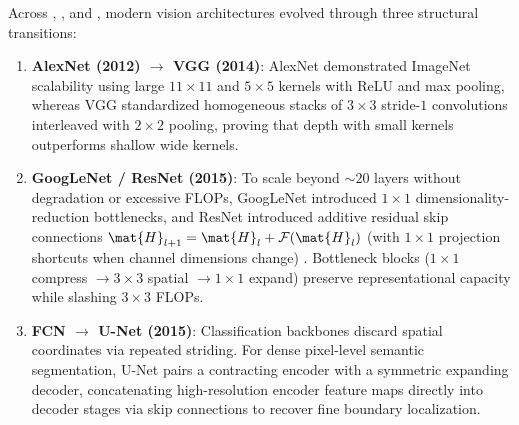 \documentclass[../../../../master.tex]{subfiles}
\begin{document}
\begin{crossbook}
\label{box:cnn:backbones}
Across , , and , modern vision architectures evolved through three structural transitions:
\begin{enumerate}
  \item \textbf{AlexNet (2012) $\to$ VGG (2014)}: AlexNet demonstrated ImageNet scalability using large $11 \times 11$ and $5 \times 5$ kernels with ReLU and max pooling, whereas VGG standardized homogeneous stacks of $3 \times 3$ stride-$1$ convolutions interleaved with $2 \times 2$ pooling, proving that depth with small kernels outperforms shallow wide kernels.
  \item \textbf{GoogLeNet / ResNet (2015)}: To scale beyond $\sim 20$ layers without degradation or excessive FLOPs, GoogLeNet introduced $1 \times 1$ dimensionality-reduction bottlenecks, and ResNet introduced additive residual skip connections $\mat{H}_{l+1} = \mat{H}_l + \mathcal{F}(\mat{H}_l)$ (with $1 \times 1$ projection shortcuts when channel dimensions change) . Bottleneck blocks ($1\times 1$ compress $\to 3\times 3$ spatial $\to 1\times 1$ expand) preserve representational capacity while slashing $3\times 3$ FLOPs.
  \item \textbf{FCN $\to$ U-Net (2015)}: Classification backbones discard spatial coordinates via repeated striding. For dense pixel-level semantic segmentation, U-Net  pairs a contracting encoder with a symmetric expanding decoder, concatenating high-resolution encoder feature maps directly into decoder stages via skip connections to recover fine boundary localization.
\end{enumerate}
\end{crossbook}

\end{document}
